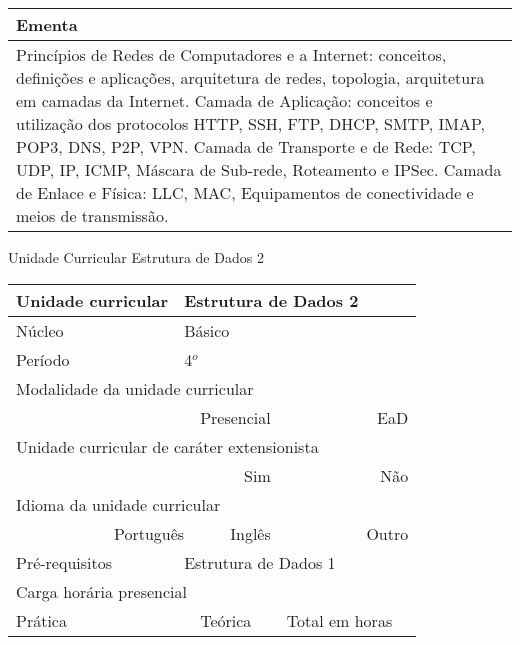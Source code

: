 \begin{quadro}[ht!]
\begin{tabular}{|p{3cm} p{2cm} p{3cm} p{2cm} p{3cm} p{2cm}|}
\multicolumn{6}{|p{15cm}|}{\cellcolor{blue1} Ementa} \\\hline
\hline\multicolumn{6}{|p{15cm}|}{\scriptsize Princípios de Redes de Computadores e a Internet: conceitos, definições e aplicações, arquitetura de redes, topologia, arquitetura em camadas da Internet. Camada de Aplicação: conceitos e utilização dos protocolos HTTP, SSH, FTP, DHCP, SMTP, IMAP, POP3, DNS, P2P, VPN. Camada de Transporte e de Rede: TCP, UDP, IP, ICMP, Máscara de Sub-rede, Roteamento e IPSec. Camada de Enlace e Física: LLC, MAC, Equipamentos de conectividade e meios de transmissão.}\\\hline
\hline
	\end{tabular}
\end{quadro}
\begin{quadro}[ht!]
  \centering\scriptsize
\caption{Unidade Curricular Estrutura de Dados 2}
\label{ unit_17 }
\begin{tabular}{|p{3cm} p{2cm} p{3cm} p{2cm} p{3cm} p{2cm}|}\hline
\multicolumn{1}{|p{3cm}|}{\cellcolor{blue1} Unidade curricular} & \multicolumn{5}{p{9cm}|}{ Estrutura de Dados 2 }\\\hline
\multicolumn{1}{|p{3cm}|}{\cellcolor{blue1} Núcleo} & \multicolumn{5}{p{11.5cm}|}{ Básico }\\\hline
\multicolumn{1}{|p{3cm}|}{\cellcolor{blue1} Período} & \multicolumn{5}{p{9cm}|}{ 4$^o$ }\\\hline
\multicolumn{6}{|p{15cm}|}{\cellcolor{blue1} Modalidade da unidade curricular} \\\hline
\multicolumn{2}{|r}{		} &  \multicolumn{2}{r}{Presencial \XBox } & \multicolumn{2}{r|}{EaD \Square	} \\\hline
\multicolumn{6}{|p{15cm}|}{\cellcolor{blue1} Unidade curricular de caráter extensionista} \\\hline
\multicolumn{4}{|r}{			Sim \Square	} & \multicolumn{2}{r|}{	Não \XBox	}\\\hline
\multicolumn{6}{|p{15cm}|}{\cellcolor{blue1} Idioma da unidade curricular} \\ \hline
\multicolumn{2}{|r}{	Português \XBox	} &  \multicolumn{2}{r}{	Inglês \Square	} & \multicolumn{2}{r|}{	Outro \Square	} \\ \hline
\multicolumn{1}{|p{3cm}|}{\cellcolor{blue1} Pré-requisitos} & \multicolumn{5}{p{9cm}|}{ Estrutura de Dados 1 }\\ \hline
\multicolumn{6}{|p{15cm}|}{\cellcolor{blue1} Carga horária presencial} \\ \hline
\multicolumn{1}{|p{3cm}|}{\raggedleft Prática} & \multicolumn{1}{p{1cm}|}{\centering	30	} &  \multicolumn{1}{p{3cm}|}{\raggedleft Teórica}  & \multicolumn{1}{p{1cm}|}{\centering 	30 } & \multicolumn{1}{p{3cm}|}{\raggedleft Total em horas} & \multicolumn{1}{p{1cm}|}{\raggedleft	60	} \\ \hline

\end{tabular}
\end{quadro}

